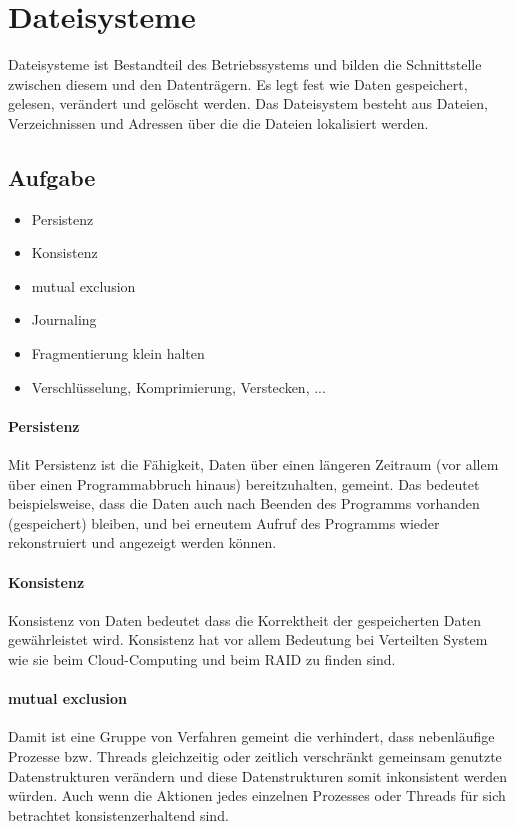 \section{Dateisysteme}
	Dateisysteme ist Bestandteil des Betriebssystems und bilden die Schnittstelle zwischen diesem und den Datenträgern. Es legt fest wie Daten gespeichert, gelesen, verändert und gelöscht werden. Das Dateisystem besteht aus Dateien, Verzeichnissen und Adressen über die die Dateien lokalisiert werden.  
\subsection{Aufgabe}
\begin{itemize}
	\item Persistenz
	\item Konsistenz
	\item mutual exclusion
	\item Journaling  
	\item Fragmentierung klein halten
	\item Verschlüsselung, Komprimierung, Verstecken, ...
\end{itemize}
\paragraph{Persistenz}
Mit Persistenz ist die Fähigkeit, Daten über einen längeren Zeitraum (vor allem über einen Programmabbruch hinaus) bereitzuhalten, gemeint. Das bedeutet beispielsweise, dass die Daten auch nach Beenden des Programms vorhanden (gespeichert) bleiben, und bei erneutem Aufruf des Programms wieder rekonstruiert und angezeigt werden können.
\paragraph{Konsistenz} 
Konsistenz von Daten bedeutet dass die Korrektheit der gespeicherten Daten gewährleistet wird. Konsistenz hat vor allem Bedeutung bei Verteilten System wie sie beim Cloud-Computing und beim RAID zu finden sind. 
\paragraph{mutual exclusion}
Damit ist eine Gruppe von Verfahren gemeint die verhindert, dass nebenläufige Prozesse bzw. Threads gleichzeitig oder zeitlich verschränkt gemeinsam genutzte Datenstrukturen verändern und diese Datenstrukturen somit inkonsistent werden würden. Auch wenn die Aktionen jedes einzelnen Prozesses oder Threads für sich betrachtet konsistenzerhaltend sind.
